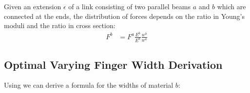 Given an extension $\epsilon$ of a link consisting of two parallel beams $a$ and $b$ which are connected at the ends,
the distribution of forces depends on the ratio in Young's moduli and the ratio in cross section:
\begin{align}
	F^b &= F^a \frac{E^b}{E^a} \frac{w^b}{w^a} \label{eq:double_beam_force_distribution}
\end{align}












\subsection{Optimal Varying Finger Width Derivation}

Using  we can derive a formula for the widths of material $b$:

